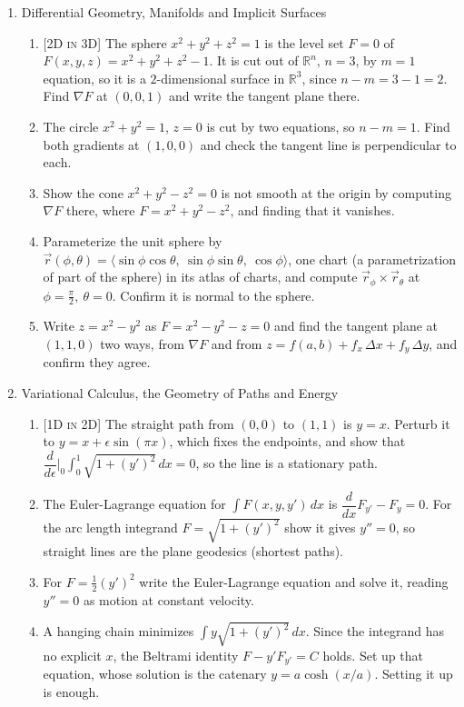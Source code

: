 \documentclass[12pt]{article}
\newcommand{\dimtag}[1]{{\footnotesize\textsc{[#1]}}\;}
\begin{document}
\begin{enumerate}
\item Differential Geometry, Manifolds and Implicit Surfaces
    \begin{enumerate}
        \item \dimtag{2D in 3D} The sphere $x^2+y^2+z^2=1$ is the level set $F=0$ of $F(x,y,z)=x^2+y^2+z^2-1$. It is cut out of $\mathbb{R}^n$, $n=3$, by $m=1$ equation, so it is a $2$-dimensional surface in $\mathbb{R}^3$, since $n-m=3-1=2$. Find $\nabla F$ at $(0,0,1)$ and write the tangent plane there.
        \item The circle $x^2+y^2=1$, $z=0$ is cut by two equations, so $n-m=1$. Find both gradients at $(1,0,0)$ and check the tangent line is perpendicular to each.
        \item Show the cone $x^2+y^2-z^2=0$ is not smooth at the origin by computing $\nabla F$ there, where $F=x^2+y^2-z^2$, and finding that it vanishes.
        \item Parameterize the unit sphere by $\vec r(\phi,\theta)=\langle \sin\phi\cos\theta,\ \sin\phi\sin\theta,\ \cos\phi\rangle$, one chart (a parametrization of part of the sphere) in its atlas of charts, and compute $\vec r_\phi\times\vec r_\theta$ at $\phi=\tfrac{\pi}{2},\ \theta=0$. Confirm it is normal to the sphere.
        \item Write $z=x^2-y^2$ as $F=x^2-y^2-z=0$ and find the tangent plane at $(1,1,0)$ two ways, from $\nabla F$ and from $z=f(a,b)+f_x\,\Delta x+f_y\,\Delta y$, and confirm they agree.
    \end{enumerate}
\newpage

\item Variational Calculus, the Geometry of Paths and Energy
    \begin{enumerate}
        \item \dimtag{1D in 2D} The straight path from $(0,0)$ to $(1,1)$ is $y=x$. Perturb it to $y=x+\epsilon\sin(\pi x)$, which fixes the endpoints, and show that $\dfrac{d}{d\epsilon}\Big|_{0}\int_0^1\sqrt{1+(y')^2}\,dx=0$, so the line is a stationary path.
        \item The Euler-Lagrange equation for $\int F(x,y,y')\,dx$ is $\dfrac{d}{dx}F_{y'}-F_y=0$. For the arc length integrand $F=\sqrt{1+(y')^2}$ show it gives $y''=0$, so straight lines are the plane geodesics (shortest paths).
        \item For $F=\tfrac12 (y')^2$ write the Euler-Lagrange equation and solve it, reading $y''=0$ as motion at constant velocity.
        \item A hanging chain minimizes $\int y\sqrt{1+(y')^2}\,dx$. Since the integrand has no explicit $x$, the Beltrami identity $F-y'F_{y'}=C$ holds. Set up that equation, whose solution is the catenary $y=a\cosh(x/a)$. Setting it up is enough.
    \end{enumerate}
\bigskip


\end{enumerate}
\end{document}
